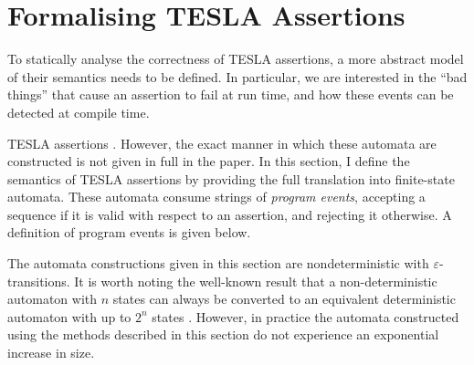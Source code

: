

\section{Formalising TESLA Assertions} \label{sec:formal}

To statically analyse the correctness of TESLA assertions, a more abstract model
of their semantics needs to be defined. In particular, we are interested in the
``bad things'' that cause an assertion to fail at run time, and how these events
can be detected at compile time.

TESLA assertions . However, the exact manner in which these automata are constructed is
not given in full in the paper. In this section, I define the semantics of TESLA
assertions by providing the full translation into finite-state automata. These
automata consume strings of \emph{program events}, accepting a sequence if it is
valid with respect to an assertion, and rejecting it otherwise. A definition of
program events is given below.

The automata constructions given in this section are nondeterministic with
$\varepsilon$-transitions. It is worth noting the well-known result that a
non-deterministic automaton with $n$ states can always be converted to an
equivalent deterministic automaton with up to $2^n$ states
\cite{rabin_finite_1959}. However, in practice the automata constructed using
the methods described in this section do not experience an exponential increase
in size.

